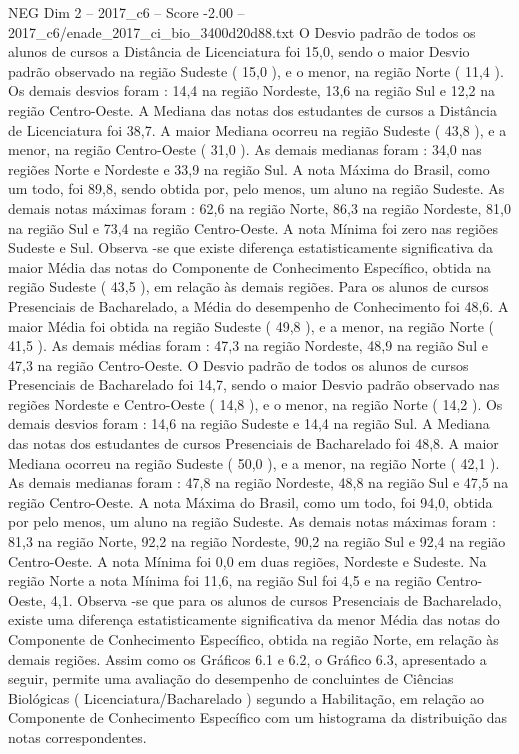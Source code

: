 \begin{textsample}{NEG Dim 2 – 2017\_c6 – Score -2.00 – 2017\_c6/enade\_2017\_ci\_bio\_3400d20d88.txt}
O Desvio padrão de todos os alunos de cursos a Distância de Licenciatura foi 15,0, sendo o maior Desvio padrão observado na região Sudeste ( 15,0 ), e o menor, na região Norte ( 11,4 ).
Os demais desvios foram : 14,4 na região Nordeste, 13,6 na região Sul e 12,2 na região Centro-Oeste.
A Mediana das notas dos estudantes de cursos a Distância de Licenciatura foi 38,7.
A maior Mediana ocorreu na região Sudeste ( 43,8 ), e a menor, na região Centro-Oeste ( 31,0 ).
As demais medianas foram : 34,0 nas regiões Norte e Nordeste e 33,9 na região Sul.
A nota Máxima do Brasil, como um todo, foi 89,8, sendo obtida por, pelo menos, um aluno na região Sudeste.
As demais notas máximas foram : 62,6 na região Norte, 86,3 na região Nordeste, 81,0 na região Sul e 73,4 na região Centro-Oeste.
A nota Mínima foi zero nas regiões Sudeste e Sul.
Observa -se que existe diferença estatisticamente significativa da maior Média das notas do Componente de Conhecimento Específico, obtida na região Sudeste ( 43,5 ), em relação às demais regiões.
Para os alunos de cursos Presenciais de Bacharelado, a Média do desempenho de Conhecimento foi 48,6.
A maior Média foi obtida na região Sudeste ( 49,8 ), e a menor, na região Norte ( 41,5 ).
As demais médias foram : 47,3 na região Nordeste, 48,9 na região Sul e 47,3 na região Centro-Oeste.
O Desvio padrão de todos os alunos de cursos Presenciais de Bacharelado foi 14,7, sendo o maior Desvio padrão observado nas regiões Nordeste e Centro-Oeste ( 14,8 ), e o menor, na região Norte ( 14,2 ).
Os demais desvios foram : 14,6 na região Sudeste e 14,4 na região Sul.
A Mediana das notas dos estudantes de cursos Presenciais de Bacharelado foi 48,8.
A maior Mediana ocorreu na região Sudeste ( 50,0 ), e a menor, na região Norte ( 42,1 ).
As demais medianas foram : 47,8 na região Nordeste, 48,8 na região Sul e 47,5 na região Centro-Oeste.
A nota Máxima do Brasil, como um todo, foi 94,0, obtida por pelo menos, um aluno na região Sudeste.
As demais notas máximas foram : 81,3 na região Norte, 92,2 na região Nordeste, 90,2 na região Sul e 92,4 na região Centro-Oeste.
A nota Mínima foi 0,0 em duas regiões, Nordeste e Sudeste.
Na região Norte a nota Mínima foi 11,6, na região Sul foi 4,5 e na região Centro-Oeste, 4,1.
Observa -se que para os alunos de cursos Presenciais de Bacharelado, existe uma diferença estatisticamente significativa da menor Média das notas do Componente de Conhecimento Específico, obtida na região Norte, em relação às demais regiões.
Assim como os Gráficos 6.1 e 6.2, o Gráfico 6.3, apresentado a seguir, permite uma avaliação do desempenho de concluintes de Ciências Biológicas ( Licenciatura/Bacharelado ) segundo a Habilitação, em relação ao Componente de Conhecimento Específico com um histograma da distribuição das notas correspondentes.

\end{textsample}
